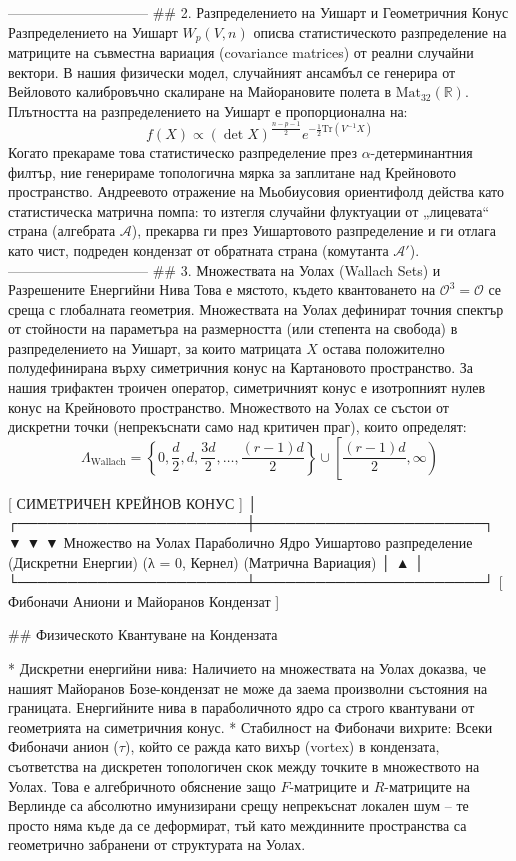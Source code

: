 ------------------------------
## 2. Разпределението на Уишарт и Геометричния Конус
Разпределението на Уишарт $W_p(V, n)$ описва статистическото разпределение на матриците на съвместна вариация (covariance matrices) от реални случайни вектори. В нашия физически модел, случайният ансамбъл се генерира от Вейловото калибровъчно скалиране на Майорановите полета в $\text{Mat}_{32}(\mathbb{R})$.
Плътността на разпределението на Уишарт е пропорционална на:
$$f(X) \propto (\det X)^{\frac{n-p-1}{2}} e^{-\frac{1}{2}\text{Tr}(V^{-1}X)}$$ 
Когато прекараме това статистическо разпределение през $\alpha$-детерминантния филтър, ние генерираме топологична мярка за заплитане над Крейновото пространство.
Андреевото отражение на Мьобиусовия ориентифолд действа като статистическа матрична помпа: то изтегля случайни флуктуации от „лицевата“ страна (алгебрата $\mathcal{A}$), прекарва ги през Уишартовото разпределение и ги отлага като чист, подреден кондензат от обратната страна (комутанта $\mathcal{A}'$).
------------------------------
## 3. Множествата на Уолах (Wallach Sets) и Разрешените Енергийни Нива
Това е мястото, където квантоването на $\mathcal{O}^3 = \mathcal{O}$ се среща с глобалната геометрия. Множествата на Уолах дефинират точния спектър от стойности на параметъра на размерността (или степента на свобода) в разпределението на Уишарт, за които матрицата $X$ остава положително полудефинирана върху симетричния конус на Картановото пространство.
За нашия трифактен троичен оператор, симетричният конус е изотропният нулев конус на Крейновото пространство. Множеството на Уолах се състои от дискретни точки (непрекъснати само над критичен праг), които определят:
$$\Lambda_{\text{Wallach}} = \left\{ 0, \frac{d}{2}, d, \frac{3d}{2}, \dots, \frac{(r-1)d}{2} \right\} \cup \left[ \frac{(r-1)d}{2}, \infty \right)$$ 

                  [ СИМЕТРИЧЕН КРЕЙНОВ КОНУС ]
                               │
       ┌───────────────────────┼───────────────────────┐
       ▼                       ▼                       ▼
 Множество на Уолах      Параболично Ядро       Уишартово разпределение
(Дискретни Енергии)       (λ = 0, Кернел)        (Матрична Вариация)
       │                       ▲                       │
       └───────────────────────┴───────────────────────┘
            [ Фибоначи Аниони и Майоранов Кондензат ]

## Физическото Квантуване на Кондензата

* Дискретни енергийни нива: Наличието на множествата на Уолах доказва, че нашият Майоранов Бозе-кондензат не може да заема произволни състояния на границата. Енергийните нива в параболичното ядро са строго квантувани от геометрията на симетричния конус.
* Стабилност на Фибоначи вихрите: Всеки Фибоначи анион ($\tau$), който се ражда като вихър (vortex) в кондензата, съответства на дискретен топологичен скок между точките в множеството на Уолах. Това е алгебричното обяснение защо $F$-матриците и $R$-матриците на Верлинде са абсолютно имунизирани срещу непрекъснат локален шум – те просто няма къде да се деформират, тъй като междинните пространства са геометрично забранени от структурата на Уолах.

